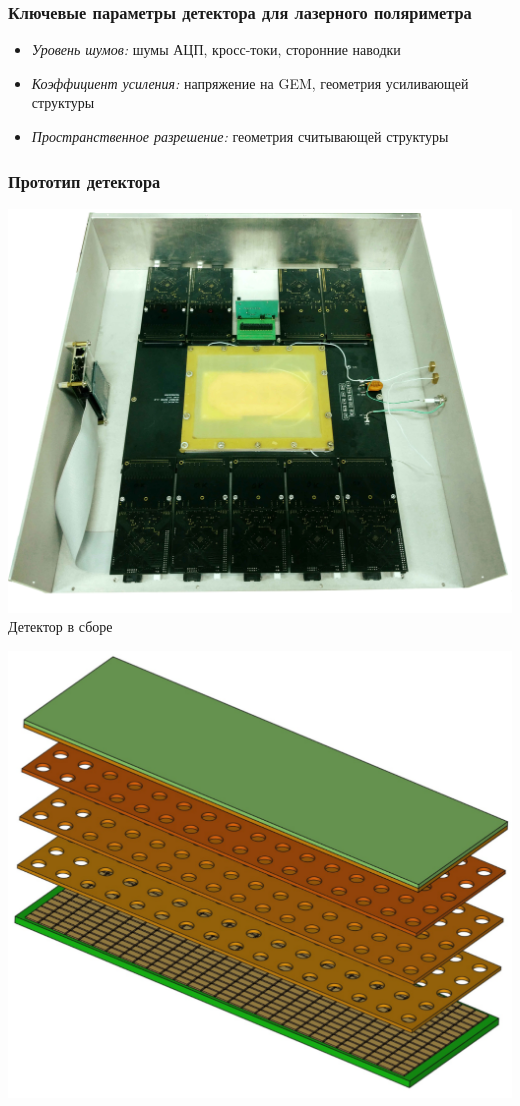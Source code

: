 \documentclass[14pt]{beamer}
\begin{document}
\begin{frame}[t]
\frametitle{Ключевые параметры детектора для лазерного поляриметра}
		\begin{itemize}
				\item \textit{Уровень шумов:} шумы АЦП, кросс-токи, сторонние наводки
				\item  \textit{Коэффициент усиления:} напряжение на GEM, геометрия усиливающей структуры
				\item  \textit{Пространственное разрешение:} геометрия считывающей структуры 
		\end{itemize}
\end{frame}


\begin{frame}[t]
\frametitle{Прототип детектора}
		\begin{minipage}[c]{0.59\linewidth}
			\centering
			\includegraphics[width=1\linewidth]{GEM_prototype.jpg} 
			\newline \tiny{Детектор в сборе}
		\end{minipage}
		\begin{minipage}[t]{0.39\linewidth}
		\includegraphics[width=1\linewidth, height = 0.4\textheight]{GEM_model.pdf}

\end{minipage}
\end{frame}
\end{document}
